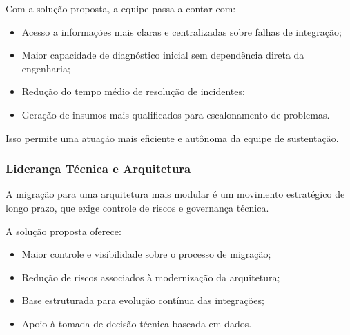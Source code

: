 Com a solução proposta, a equipe passa a contar com:

\begin{itemize}
    \item Acesso a informações mais claras e centralizadas sobre falhas de integração;
    \item Maior capacidade de diagnóstico inicial sem dependência direta da engenharia;
    \item Redução do tempo médio de resolução de incidentes;
    \item Geração de insumos mais qualificados para escalonamento de problemas.
\end{itemize}

Isso permite uma atuação mais eficiente e autônoma da equipe de sustentação.

\subsubsection{Liderança Técnica e Arquitetura}

A migração para uma arquitetura mais modular é um movimento estratégico de longo prazo, que exige controle de riscos e governança técnica.

A solução proposta oferece:

\begin{itemize}
    \item Maior controle e visibilidade sobre o processo de migração;
    \item Redução de riscos associados à modernização da arquitetura;
    \item Base estruturada para evolução contínua das integrações;
    \item Apoio à tomada de decisão técnica baseada em dados.
\end{itemize}